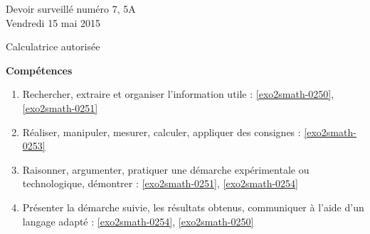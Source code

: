 \documentclass[a4paper,10pt]{article}
\begin{document}
\begin{feuilleDS}{Devoir surveillé numéro 7, 5A\\ \small Vendredi 15 mai 2015}
    \begin{center}
        Calculatrice autorisée
    \end{center}
\vspace{1cm}
{\bf Compétences}
\small
\begin{enumerate}
    \item
        Rechercher, extraire et organiser l'information utile : \ref{exo2smath-0250}, \ref{exo2smath-0251}
    \item
        Réaliser, manipuler, mesurer, calculer, appliquer des consignes : \ref{exo2smath-0253}
    \item
        Raisonner, argumenter, pratiquer une démarche expérimentale ou technologique, démontrer : \ref{exo2smath-0251}, \ref{exo2smath-0254}
    \item 
        Présenter la démarche suivie, les résultats obtenus, communiquer à l'aide d’un langage adapté : \ref{exo2smath-0254}, \ref{exo2smath-0250}
\end{enumerate}
\end{feuilleDS}
\end{document}
